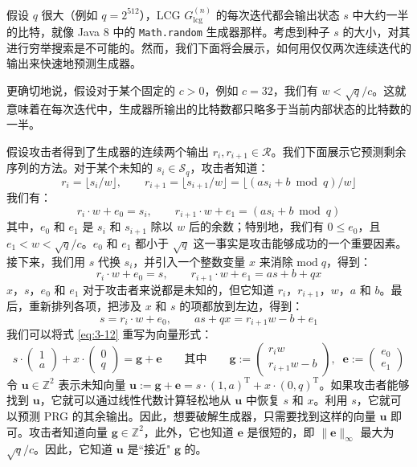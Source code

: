 \begin{snote}[密码分析。]
假设 $q$ 很大（例如 $q=2^{512}$），LCG $G_\mathrm{lcg}^{(n)}$ 的每次迭代都会输出状态 $s$ 中大约一半的比特，就像 Java 8 中的 \texttt{Math.random} 生成器那样。考虑到种子 $s$ 的大小，对其进行穷举搜索是不可能的。然而，我们下面将会展示，如何用仅仅两次连续迭代的输出来快速地预测生成器。

更确切地说，假设对于某个固定的 $c>0$，例如 $c=32$，我们有 $w<\sqrt{q}/c$。这就意味着在每次迭代中，生成器所输出的比特数都只略多于当前内部状态的比特数的一半。

假设攻击者得到了生成器的连续两个输出 $r_i,r_{i+1}\in\mathcal{R}$。我们下面展示它预测剩余序列的方法。对于某个未知的 $s_i\in\mathcal{S}_q$，攻击者知道：
\[
r_i=\lfloor s_i/w\rfloor,
\quad\quad
r_{i+1}=\lfloor s_{i+1}/w\rfloor=\lfloor(as_i+b\bmod q)/w\rfloor
\]
我们有：
\[
r_i\cdot w+e_0=s_i,\quad\quad
r_{i+1}\cdot w+e_1=(as_i+b\bmod q)
\]
其中，$e_0$ 和 $e_1$ 是 $s_i$ 和 $s_{i+1}$ 除以 $w$ 后的余数；特别地，我们有 $0\leq e_0$，且 $e_1<w<\sqrt{q}/c$。$e_0$ 和 $e_1$ 都小于 $\sqrt{q}$ 这一事实是攻击能够成功的一个重要因素。接下来，我们用 $s$ 代换 $s_i$，并引入一个整数变量 $x$ 来消除 $\mathrm{mod}\;q$，得到：
\[
r_i\cdot w+e_0=s,\quad\quad
r_{i+1}\cdot w+e_1=as+b+qx
\]
$x$，$s$，$e_0$ 和 $e_1$ 对于攻击者来说都是未知的，但它知道 $r_i$，$r_{i+1}$，$w$，$a$ 和 $b$。最后，重新排列各项，把涉及 $x$ 和 $s$ 的项都放到左边，得到：
\begin{equation}\label{eq:3-12}
s=r_i\cdot w+e_0,
\quad\quad
as+qx=r_{i+1}w-b+e_1
\end{equation}
我们可以将式 \ref{eq:3-12} 重写为向量形式：
\begin{equation}
s\cdot
\begin{pmatrix}
1\\a
\end{pmatrix}
+x\cdot
\begin{pmatrix}
0\\q
\end{pmatrix}
=\boldsymbol{g}+\boldsymbol{e}
\quad\quad
\text{其中}
\quad\quad
\boldsymbol{g}:=
\begin{pmatrix}
r_iw\\r_{i+1}w-b
\end{pmatrix}
,\;\;
\boldsymbol{e}:=
\begin{pmatrix}
e_0\\e_1
\end{pmatrix}
\end{equation}
令 $\boldsymbol{u}\in\mathbb{Z}^2$ 表示未知向量 $\boldsymbol{u}:=\boldsymbol{g}+\boldsymbol{e}=s\cdot(1,a)^\mathrm{T}+x\cdot(0,q)^\mathrm{T}$。如果攻击者能够找到 $\boldsymbol{u}$，它就可以通过线性代数计算轻松地从 $\boldsymbol{u}$ 中恢复 $s$ 和 $x$。利用 $s$，它就可以预测 PRG 的其余输出。因此，想要破解生成器，只需要找到这样的向量 $\boldsymbol{u}$ 即可。攻击者知道向量 $\boldsymbol{g}\in\mathbb{Z}^2$，此外，它也知道 $\boldsymbol{e}$ 是很短的，即 $\lVert\boldsymbol{e}\rVert_\infty$ 最大为 $\sqrt{q}/c$。因此，它知道 $\boldsymbol{u}$ 是``接近" $\boldsymbol{g}$ 的。


\end{snote}
